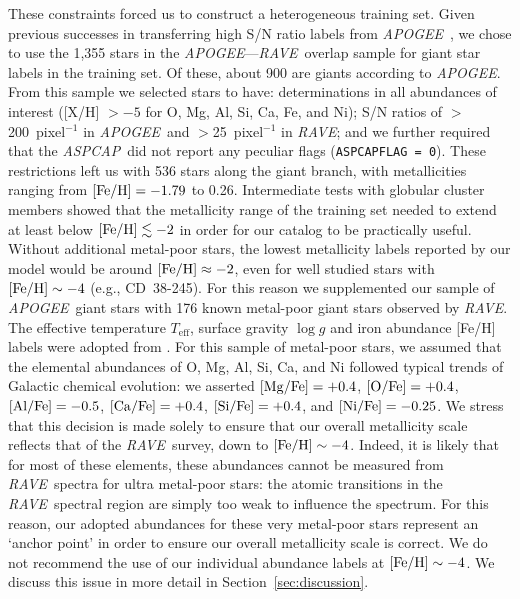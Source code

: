 \documentclass[preprint]{aastex}
\newcommand{\acronym}[1]{{\small{#1}}}
\newcommand{\project}[1]{\textsl{#1}}
\newcommand{\rave}{\project{\acronym{RAVE}}}
\newcommand{\apogee}{\project{\acronym{APOGEE}}}
\newcommand{\aspcap}{\project{\acronym{ASPCAP}}}
\newcommand{\teff}{T_{\mathrm{eff}}}
\newcommand{\logg}{\log g}
\begin{document}
These constraints forced us to construct a heterogeneous training set.  Given previous
successes in transferring high S/N ratio labels from \apogee\ \citep{Ness_2015,
Ness_2016,Ho_2016,Casey_2016b}, we chose to use the 1,355 stars in the \apogee---\rave\ 
overlap sample for giant star labels in the training set.  Of these, about 900 are 
giants according to \apogee.  From this sample we selected stars to have: 
determinations in all abundances of interest ([X/H] $> -5$ for O, Mg, Al, Si, Ca, Fe, 
and Ni); S/N ratios of $>$200~pixel$^{-1}$ in \apogee\ and $>$25~pixel$^{-1}$ in \rave; 
and we further required that the \aspcap\ did not report any peculiar flags 
(\texttt{ASPCAPFLAG = 0}).  These restrictions left us with 536 stars along the giant 
branch, with metallicities ranging from $[{\rm Fe/H}] = -1.79$ to 0.26.  Intermediate 
tests with globular cluster members showed that the metallicity range of the training 
set needed to extend at least below $[{\rm Fe/H}] \lesssim -2$ in order for our catalog 
to be practically useful.  Without additional metal-poor stars, the lowest metallicity
labels reported by our model would be around $[{\rm Fe/H}] \approx -2$, even for well
studied stars with $[{\rm Fe/H}] \sim -4$ (e.g., CD~38-245).  For this reason we
supplemented our sample of \apogee\ giant stars with 176 known metal-poor giant stars 
observed by \rave.  The effective temperature $\teff$, surface gravity $\logg$ and
iron abundance [Fe/H] labels were adopted from \citet{Fulbright_2010, Ruchti_2011}.
For this sample of metal-poor stars, we assumed that the elemental abundances of O, 
Mg, Al, Si, Ca, and Ni followed typical trends of Galactic chemical evolution: we
asserted $[{\rm Mg/Fe}] = +0.4$, $[{\rm O/Fe}] = +0.4$, $[{\rm Al/Fe}] = -0.5$, 
$[{\rm Ca/Fe}] = +0.4$, $[{\rm Si/Fe}] = +0.4$, and $[{\rm Ni/Fe}] = -0.25$.  We stress
that this decision is made solely to ensure that our overall metallicity scale reflects
that of the \rave\ survey, down to $[{\rm Fe/H}] \sim -4$.  Indeed, it is likely that 
for most of these elements, these abundances cannot be measured from \rave\ spectra for 
ultra metal-poor stars: the atomic transitions in the \rave\ spectral region are simply
too weak to influence the spectrum.  For this reason, our adopted abundances for these
very metal-poor stars represent an `anchor point' in order to ensure our overall 
metallicity scale is correct.  We do not recommend the use of our individual abundance
labels at $[{\rm Fe/H}] \sim -4$.  We discuss this issue in more detail in Section~\ref{sec:discussion}.
\end{document}
